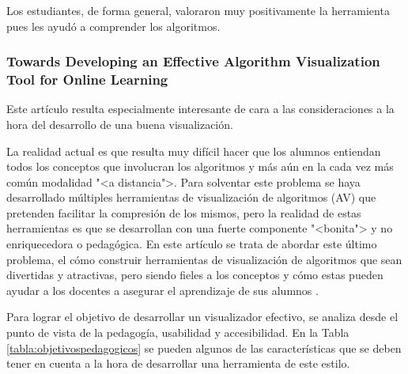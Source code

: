 Los estudiantes, de forma general, valoraron muy positivamente la herramienta
pues les ayudó a comprender los algoritmos.

\subsubsection{Towards Developing an Effective Algorithm Visualization Tool for
Online Learning} 

Este artículo resulta especialmente interesante de cara a las
consideraciones a la hora del desarrollo de una buena visualización.


La realidad actual es que resulta muy difícil hacer que los alumnos entiendan
todos los conceptos que involucran los algoritmos y más aún en la cada vez más
común modalidad "<a distancia">. Para solventar este problema se haya
desarrollado múltiples herramientas de visualización de algoritmos (AV) que
pretenden facilitar la compresión de los mismos, pero la realidad de estas
herramientas es que se desarrollan con una fuerte componente "<bonita"> y no
enriquecedora o pedagógica. En este artículo se trata de abordar este último
problema, el cómo construir herramientas de visualización de algoritmos que sean
divertidas y atractivas, pero siendo fieles a los conceptos y cómo estas pueden
ayudar a los docentes a asegurar el aprendizaje de sus alumnos \cite{8560314}.

Para lograr el objetivo de desarrollar un visualizador efectivo, se analiza
desde el punto de vista de la pedagogía, usabilidad y accesibilidad. En la Tabla
\ref{tabla:objetivospedagogicos} se pueden algunos de las características que se
deben tener en cuenta a la hora de desarrollar una herramienta de este estilo.

